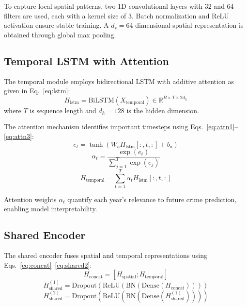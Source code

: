 \documentclass[conference]{IEEEtran}
\begin{document}
To capture local spatial patterns, two 1D convolutional layers with 32 and 64 filters are used, each with a kernel size of 3. Batch normalization and ReLU activation ensure stable training. A $d_s = 64$ dimensional spatial representation is obtained through global max pooling.

\subsection{Temporal LSTM with Attention}

The temporal module employs bidirectional LSTM with additive attention as given in Eq.~\eqref{eq:lstm}:
\begin{equation}
H_{\text{lstm}} = \text{BiLSTM}(X_{\text{temporal}}) \in \mathbb{R}^{B \times T \times 2d_h}
\label{eq:lstm}
\end{equation}
where $T$ is sequence length and $d_h = 128$ is the hidden dimension.

The attention mechanism identifies important timesteps using Eqs.~\eqref{eq:attn1}--\eqref{eq:attn3}:
\begin{equation}
e_t = \tanh(W_a H_{\text{lstm}}[:, t, :] + b_a)
\label{eq:attn1}
\end{equation}
\begin{equation}
\alpha_t = \frac{\exp(e_t)}{\sum_{j=1}^{T} \exp(e_j)}
\label{eq:attn2}
\end{equation}
\begin{equation}
H_{\text{temporal}} = \sum_{t=1}^{T} \alpha_t H_{\text{lstm}}[:, t, :]
\label{eq:attn3}
\end{equation}

Attention weights $\alpha_t$ quantify each year's relevance to future crime prediction, enabling model interpretability.

\subsection{Shared Encoder}

The shared encoder fuses spatial and temporal representations using Eqs.~\eqref{eq:concat}--\eqref{eq:shared2}:
\begin{equation}
H_{\text{concat}} = [H_{\text{spatial}}; H_{\text{temporal}}]
\label{eq:concat}
\end{equation}
\begin{equation}
H_{\text{shared}}^{(1)} = \text{Dropout}(\text{ReLU}(\text{BN}(\text{Dense}(H_{\text{concat}}))))
\label{eq:shared1}
\end{equation}
\begin{equation}
H_{\text{shared}}^{(2)} = \text{Dropout}(\text{ReLU}(\text{BN}(\text{Dense}(H_{\text{shared}}^{(1)}))))
\label{eq:shared2}
\end{equation}
\end{document}
